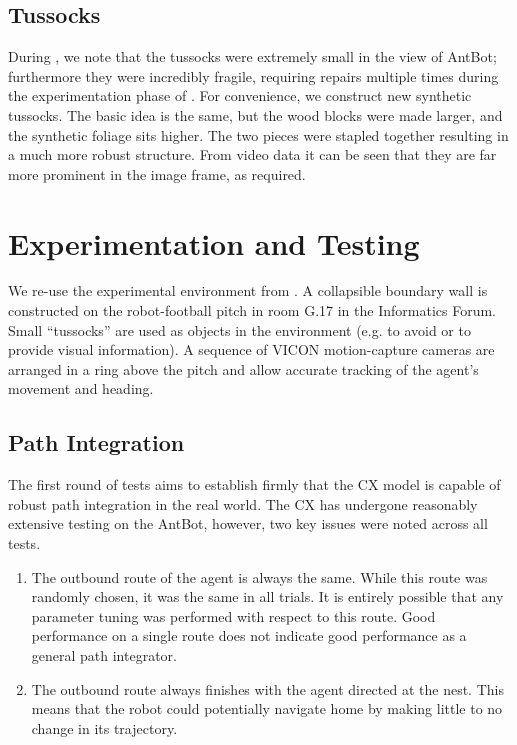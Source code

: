 \documentclass[a4paper,11pt,twoside,openright]{article}
\let\oldsection\section
\def\section{\cleardoublepage\oldsection}
\begin{document}
\subsection{Tussocks}
During \cite{Mitchell2018}, we note that the tussocks were extremely
small in the view of AntBot; furthermore they were incredibly
fragile, requiring repairs multiple times during the experimentation
phase of \cite{Mitchell2018}. For convenience, we construct new synthetic
tussocks. The basic idea is the same, but the wood blocks were made
larger, and the synthetic foliage sits higher. The two pieces were
stapled together resulting in a much more robust structure. From video
data it can be seen that they are far more prominent in the image
frame, as required.

\section{Experimentation and Testing}\label{sec:test}
We re-use the experimental environment from \cite{Mitchell2018}. A
collapsible boundary wall is constructed on the robot-football pitch
in room G.17 in the Informatics Forum. Small ``tussocks'' are used as
objects in the environment (e.g. to avoid or to provide visual
information). A sequence of VICON motion-capture cameras are arranged
in a ring above the pitch and allow accurate tracking of the agent's
movement and heading.

\subsection{Path Integration}
The first round of tests aims to establish firmly that the CX model is capable of
robust path integration in the real world. The CX has undergone reasonably
extensive testing on the AntBot, however, two key issues were noted across all
tests.

\begin{enumerate}
\item{ The outbound route of the agent is always the same. While this
  route was randomly chosen, it was the same in all trials. It is
  entirely possible that any parameter tuning was performed with
  respect to this route. Good performance on a single route does not
  indicate good performance as a general path integrator.  }

\item{
  The outbound route always finishes with the agent directed at the nest. This
  means that the robot could potentially navigate home by making little to no
  change in its trajectory.
}
\end{enumerate}
\end{document}
